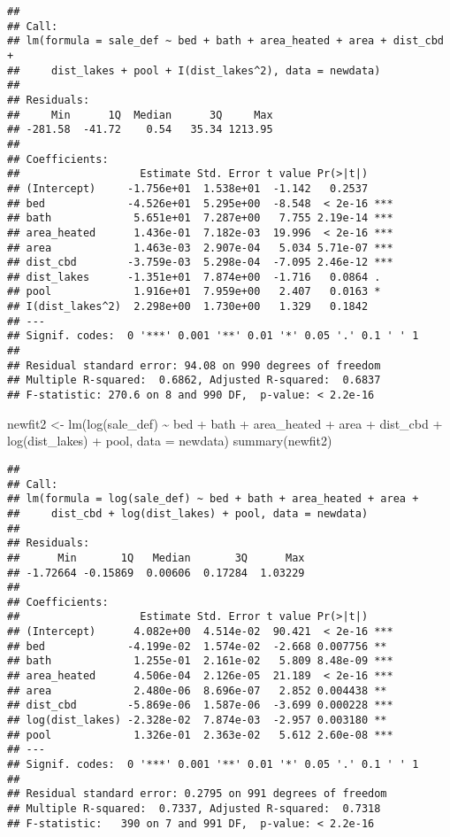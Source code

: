 \documentclass[
]{article}
\newenvironment{Shaded}{\begin{snugshade}}{\end{snugshade}}
\newcommand{\AttributeTok}[1]{\textcolor[rgb]{0.77,0.63,0.00}{#1}}
\newcommand{\FunctionTok}[1]{\textcolor[rgb]{0.00,0.00,0.00}{#1}}
\newcommand{\NormalTok}[1]{#1}
\newcommand{\OtherTok}[1]{\textcolor[rgb]{0.56,0.35,0.01}{#1}}
\newcommand{\SpecialCharTok}[1]{\textcolor[rgb]{0.00,0.00,0.00}{#1}}
\begin{document}
\begin{verbatim}
## 
## Call:
## lm(formula = sale_def ~ bed + bath + area_heated + area + dist_cbd + 
##     dist_lakes + pool + I(dist_lakes^2), data = newdata)
## 
## Residuals:
##     Min      1Q  Median      3Q     Max 
## -281.58  -41.72    0.54   35.34 1213.95 
## 
## Coefficients:
##                   Estimate Std. Error t value Pr(>|t|)    
## (Intercept)     -1.756e+01  1.538e+01  -1.142   0.2537    
## bed             -4.526e+01  5.295e+00  -8.548  < 2e-16 ***
## bath             5.651e+01  7.287e+00   7.755 2.19e-14 ***
## area_heated      1.436e-01  7.182e-03  19.996  < 2e-16 ***
## area             1.463e-03  2.907e-04   5.034 5.71e-07 ***
## dist_cbd        -3.759e-03  5.298e-04  -7.095 2.46e-12 ***
## dist_lakes      -1.351e+01  7.874e+00  -1.716   0.0864 .  
## pool             1.916e+01  7.959e+00   2.407   0.0163 *  
## I(dist_lakes^2)  2.298e+00  1.730e+00   1.329   0.1842    
## ---
## Signif. codes:  0 '***' 0.001 '**' 0.01 '*' 0.05 '.' 0.1 ' ' 1
## 
## Residual standard error: 94.08 on 990 degrees of freedom
## Multiple R-squared:  0.6862, Adjusted R-squared:  0.6837 
## F-statistic: 270.6 on 8 and 990 DF,  p-value: < 2.2e-16
\end{verbatim}

\begin{Shaded}
\begin{Highlighting}[]
\NormalTok{newfit2 }\OtherTok{\textless{}{-}}  \FunctionTok{lm}\NormalTok{(}\FunctionTok{log}\NormalTok{(sale\_def) }\SpecialCharTok{\textasciitilde{}}\NormalTok{ bed }\SpecialCharTok{+}\NormalTok{ bath }\SpecialCharTok{+}\NormalTok{ area\_heated }\SpecialCharTok{+}\NormalTok{ area }\SpecialCharTok{+}\NormalTok{ dist\_cbd }\SpecialCharTok{+} \FunctionTok{log}\NormalTok{(dist\_lakes) }\SpecialCharTok{+}\NormalTok{ pool, }\AttributeTok{data =}\NormalTok{ newdata)}
\FunctionTok{summary}\NormalTok{(newfit2)}
\end{Highlighting}
\end{Shaded}

\begin{verbatim}
## 
## Call:
## lm(formula = log(sale_def) ~ bed + bath + area_heated + area + 
##     dist_cbd + log(dist_lakes) + pool, data = newdata)
## 
## Residuals:
##      Min       1Q   Median       3Q      Max 
## -1.72664 -0.15869  0.00606  0.17284  1.03229 
## 
## Coefficients:
##                   Estimate Std. Error t value Pr(>|t|)    
## (Intercept)      4.082e+00  4.514e-02  90.421  < 2e-16 ***
## bed             -4.199e-02  1.574e-02  -2.668 0.007756 ** 
## bath             1.255e-01  2.161e-02   5.809 8.48e-09 ***
## area_heated      4.506e-04  2.126e-05  21.189  < 2e-16 ***
## area             2.480e-06  8.696e-07   2.852 0.004438 ** 
## dist_cbd        -5.869e-06  1.587e-06  -3.699 0.000228 ***
## log(dist_lakes) -2.328e-02  7.874e-03  -2.957 0.003180 ** 
## pool             1.326e-01  2.363e-02   5.612 2.60e-08 ***
## ---
## Signif. codes:  0 '***' 0.001 '**' 0.01 '*' 0.05 '.' 0.1 ' ' 1
## 
## Residual standard error: 0.2795 on 991 degrees of freedom
## Multiple R-squared:  0.7337, Adjusted R-squared:  0.7318 
## F-statistic:   390 on 7 and 991 DF,  p-value: < 2.2e-16
\end{verbatim}
\end{document}
